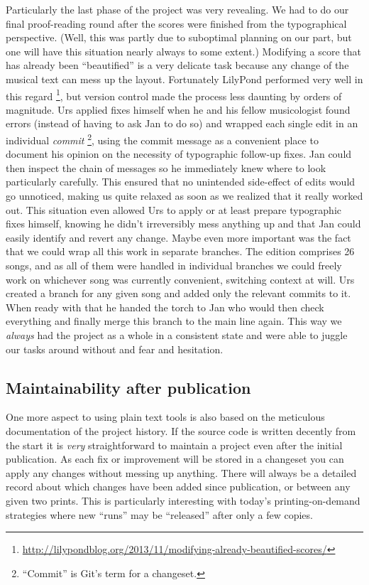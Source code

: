 \documentclass[11pt,a4paper]{article}
\begin{document}
Particularly the last phase of the project was very revealing. We had to do our final
proof-reading round after the scores were finished from the typographical perspective.
(Well, this was partly due to suboptimal planning on our part, but one will have this
situation nearly always to some extent.) Modifying a score that has already been
“beautified” is a very delicate task because any change of the musical text can
mess up the layout. Fortunately LilyPond performed very well in this regard%
\footnote{\url{http://lilypondblog.org/2013/11/modifying-already-beautified-scores/}},
but version control made the process less daunting by orders of magnitude.
Urs applied fixes  himself when he and his fellow musicologist found errors (instead
of having to ask Jan to do so) and wrapped each single edit in an individual \emph{commit}%
\footnote{“Commit” is Git's term for a changeset.},
using the commit message as a convenient place to document his opinion on the necessity of
typographic follow-up fixes. Jan could then inspect the chain of messages so he
immediately knew where to look particularly carefully. This ensured that no unintended
side-effect of edits would go unnoticed, making us quite relaxed as soon as we realized
that it really worked out. This situation even allowed Urs to apply or at least prepare
typographic fixes himself, knowing he didn't irreversibly mess anything up and that Jan
could easily identify and revert any change.
Maybe even more important was the fact that we could wrap all this work in separate branches.
The edition comprises 26 songs, and as all of them were handled in individual branches
we could freely work on whichever song was currently convenient, switching context at
will. Urs created a branch for any given song and added only the relevant commits to it.
When ready with that he handed the torch to Jan who would then check everything and
finally merge this branch to the main line again. This way we \emph{always} had the project
as a whole in a consistent state and were able to juggle our tasks around without and fear
and hesitation.

\subsection{Maintainability after publication}
One more aspect to using plain text tools is also based on the meticulous documentation
of the project history. If the source code is written decently from the start it is
\emph{very} straightforward to maintain a project even after the initial publication.
As each fix or improvement will be stored in a changeset you can apply any changes
without messing up anything. There will always be a detailed record about which
changes have been added since publication, or between any given two prints. This is
particularly interesting with today's printing-on-demand strategies where new “runs”
may be “released” after only a few copies.
\end{document}
